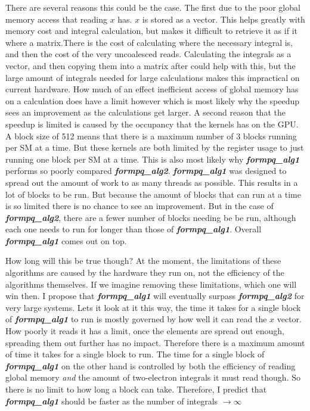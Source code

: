 \documentclass[12pt]{report}
\newcommand{\kernel}[1]{\textit{\textbf{#1}}}
\begin{document}
There are several reasons this could be the case. The first due to the poor global memory access that reading $x$ has. $x$ is stored as a vector. This helps greatly with memory cost and integral calculation, but makes it difficult to retrieve it as if it where a matrix.There is the cost of calculating where the necessary integral is, and then the cost of the very uncoalesced reads. Calculating the integrals as a vector, and then copying them into a matrix after could help with this, but the large amount of integrals needed for large calculations makes this impractical on current hardware. How much of an effect inefficient access of global memory has on a calculation does have a limit however which is most likely why the speedup sees an improvement as the calculations get larger. A second reason that the speedup is limited is caused by the occupancy that the kernels has on the GPU. A block size of 512 means that there is a maximum number of 3 blocks running per SM at a time. But these kernels are both limited by the register usage to just running one block per SM at a time. This is also most likely why \kernel{formpq\_alg1} performs so poorly compared \kernel{formpq\_alg2}. \kernel{formpq\_alg1} was designed to spread out the amount of work to as many threads as possible. This results in a lot of blocks to be run. But because the amount of blocks that can run at a time is so limited there is no chance to see an improvement. But in the case of \kernel{formpq\_alg2}, there are a fewer number of blocks needing be be run, although each one needs to run for longer than those of \kernel{formpq\_alg1}. Overall \kernel{formpq\_alg1} comes out on top.

How long will this be true though? At the moment, the limitations of these algorithms are caused by the hardware they run on, not the efficiency of the algorithms themselves. If we imagine removing these limitations, which one will win then. I propose that \kernel{formpq\_alg1} will eventually surpass \kernel{formpq\_alg2} for very large systems. Lets it look at it this way, the time it takes for a single block of \kernel{formpq\_alg1} to run is mostly governed by how well it can read the $x$ vector. How poorly it reads it has a limit, once the elements are spread out enough, spreading them out further has no impact. Therefore there is a maximum amount of time it takes for a single block to run. The time for a single block of \kernel{formpq\_alg1} on the other hand is controlled by both the efficiency of reading global memory \textit{and} the amount of two-electron integrals it must read though. So there is no limit to how long a block can take. Therefore, I predict that \kernel{formpq\_alg1} should be faster as the number of integrals $\rightarrow \infty$
\end{document}
